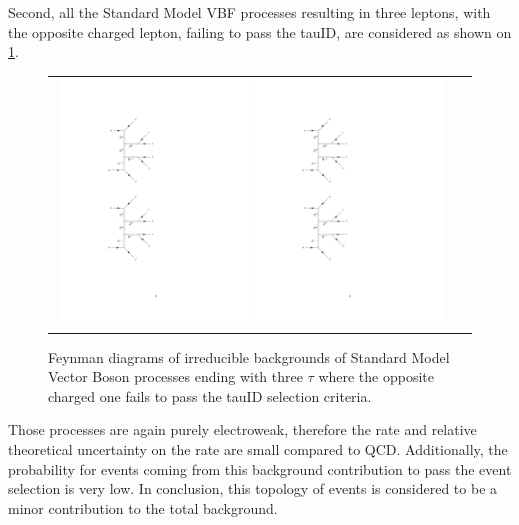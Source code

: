 Second, all the Standard Model VBF processes resulting in three leptons, with the opposite charged lepton, failing to pass the tauID, are considered as shown on \ref{fig:background_SMVBFZ0Wmiss}.

\begin{figure}[tbh!]
	\centering
	\begin{tabular}{cc}
		\includegraphics[width=0.48\textwidth]{diagrams/pics/background_SMVBFZ0Wmissminus.pdf}
		\includegraphics[width=0.48\textwidth]{diagrams/pics/background_SMVBFZ0Wmissplus.pdf} 		
	\end{tabular}
	\caption{Feynman diagrams of irreducible backgrounds of Standard Model Vector Boson  processes ending with three $\tau$ where the opposite charged one fails to pass the tauID selection criteria. }
	\label{fig:background_SMVBFZ0Wmiss}
\end{figure}

Those processes are again purely electroweak, therefore the rate and relative theoretical uncertainty on the rate are small compared to QCD. Additionally, the probability for events coming from this background contribution to pass the event selection is very low. In conclusion, this topology of events is considered to be a minor contribution to the total background.  

